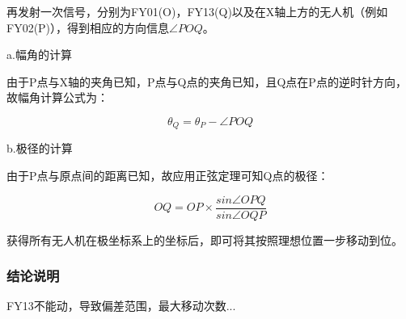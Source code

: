 \documentclass{ctexart}
\begin{document}
再发射一次信号，分别为FY01(O)，FY13(Q)以及在X轴上方的无人机（例如FY02(P)），得到相应的方向信息$\angle POQ$。

a.幅角的计算

由于P点与X轴的夹角已知，P点与Q点的夹角已知，且Q点在P点的逆时针方向，故幅角计算公式为：

\begin{equation}
  \theta_Q=\theta_P-\angle POQ
\end{equation}

b.极径的计算

由于P点与原点间的距离已知，故应用正弦定理可知Q点的极径：

\[
  OQ=OP\times \frac{sin \angle OPQ}{sin\angle OQP}
\]

获得所有无人机在极坐标系上的坐标后，即可将其按照理想位置一步移动到位。

\subsubsection{结论说明}

FY13不能动，导致偏差范围，最大移动次数...









  
\end{document}
